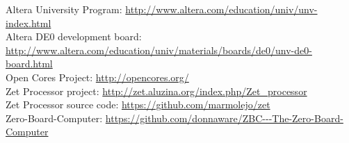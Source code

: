 \documentclass[twoside]{article}
\begin{document}

\begin{thebibliography}{99}

Altera University Program: \url{http://www.altera.com/education/univ/unv-index.html} \\
Altera DE0 development board: \url{http://www.altera.com/education/univ/materials/boards/de0/unv-de0-board.html} \\
Open Cores Project: \url{http://opencores.org/} \\
Zet Processor project: \url{http://zet.aluzina.org/index.php/Zet_processor} \\
Zet Processor source code: \url{https://github.com/marmolejo/zet} \\
Zero-Board-Computer: \url{https://github.com/donnaware/ZBC---The-Zero-Board-Computer} 

\end{thebibliography}

\end{document}
